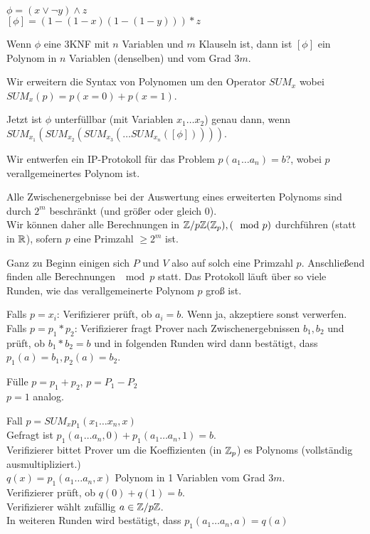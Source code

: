 $\phi = (x \lor \neg y) \land z$ \\
$[\phi] = (1 - (1-x) (1-(1-y))) * z$


Wenn $\phi$ eine 3KNF mit $n$ Variablen und $m$ Klauseln ist, dann ist $[\phi]$
ein Polynom in $n$ Variablen (denselben) und vom Grad $3m$.





Wir erweitern die Syntax von Polynomen um den Operator
$SUM_x$ wobei $SUM_x(p) = p(x=0) + p(x=1)$.

Jetzt ist $\phi$ unterfüllbar (mit Variablen $x_1 \dots x_2$) genau dann, wenn
\\
$SUM_{x_1}(SUM_{x_2}(SUM_{x_3}(\dots  SUM_{x_n}([\phi]) )))$.

Wir entwerfen ein IP-Protokoll für das Problem $p(a_1 \dots a_n) = b$?,
wobei $p$ verallgemeinertes Polynom ist.

Alle Zwischenergebnisse bei der Auswertung eines erweiterten Polynoms
sind durch $2^m$ beschränkt (und größer oder gleich 0).\\
Wir können daher alle Berechnungen in $\mathbb{Z} / p\mathbb{Z} (\mathbb{Z}_p), (\mod p)$ durchführen
(statt in $\mathbb{R}$), sofern $p$ eine Primzahl $\geq 2^m$ ist.

Ganz zu Beginn einigen sich $P$ und $V$ also auf solch eine Primzahl $p$.
Anschließend finden alle Berechnungen $\mod p$ statt.
Das Protokoll läuft über so viele Runden, wie das verallgemeinerte Polynom $p$ groß ist.


Falls $p = x_i$: Verifizierer prüft, ob $a_i = b$. Wenn ja, akzeptiere sonst verwerfen.
\\
Falls $p = p_1 * p_2$: Verifizierer fragt Prover nach Zwischenergebnissen
$b_1, b_2$ und prüft, ob $b_1 * b_2 = b$ und in folgenden Runden wird dann
bestätigt, dass $p_1(a) = b_1, p_2(a) = b_2$.



Fülle $p = p_1 + p_2$, $p = P_1 - P_2$ \\
$p = 1$ analog.

Fall $p = SUM_x p_1(x_1 \dots x_n, x)$
\\
Gefragt ist $p_1(a_1 \dots a_n, 0) + p_1(a_1 \dots a_n, 1) = b$.
\\
Verifizierer bittet Prover um die Koeffizienten (in $\mathbb{Z}_p$) es Polynoms
(vollständig ausmultipliziert.)
\\
$q(x) = p_1(a_1 \dots a_n, x)$ Polynom in 1 Variablen vom Grad $3m$.
\\
Verifizierer prüft, ob $q(0) + q(1) = b$.
\\
Verifizierer wählt zufällig $a \in \mathbb{Z}/p\mathbb{Z}$.
\\
In weiteren Runden wird bestätigt, dass
$p_1(a_1 \dots a_n, a) = q(a)$

